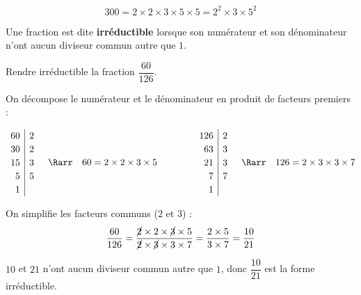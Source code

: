 \begin{ex}[Décomposition]
	\[
		300 = 2 \times 2 \times 3 \times 5 \times 5 = 2^2 \times 3 \times 5^2
	\]
\end{ex}

\begin{defin}
	Une fraction est dite \textbf{irréductible} lorsque son numérateur et son dénominateur n'ont aucun diviseur commun autre que $1$.
\end{defin}

\begin{methode}
	Rendre irréductible la fraction $\dfrac{60}{126}$.

	\begin{correction}
		On décompose le numérateur et le dénominateur en produit de facteurs premiers :

		\[
			\def\arraystretch{1.2}%
			\begin{array}{r|l}%
				60 & 2 \\
				30 & 2 \\
				15 & 3 \\
				5  & 5 \\
				1  &
			\end{array}%
			\quad \Rarr \quad 60 = 2 \times 2 \times 3 \times 5 \qquad\qquad \def\arraystretch{1.2}%
			\begin{array}{r|l}%
				126 & 2 \\
				63  & 3 \\
				21  & 3 \\
				7   & 7 \\
				1   &
			\end{array}%
			\quad \Rarr \quad 126 = 2 \times 3 \times 3 \times 7
		\]

		\ms

		On simplifie les facteurs communs ($2$ et $3$) :
		\[
			\frac{60}{126} = \frac{\cancel{2} \times 2 \times \cancel{3} \times 5}{\cancel{2} \times \cancel{3} \times 3 \times 7} = \frac{2 \times 5}{3 \times 7} = \frac{10}{21}
		\]

		$10$ et $21$ n'ont aucun diviseur commun autre que $1$, donc $\dfrac{10}{21}$ est la forme irréductible.
	\end{correction}
\end{methode}

